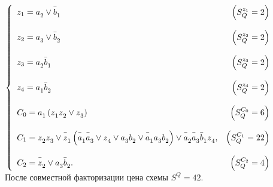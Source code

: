 \documentclass[a4paper, 12pt]{article}
\begin{document}
$\left\lbrace\begin{array}{l r}
	z_1={\mathstrut a}_2\vee\bar{\mathstrut b}_1 & \left(S_Q^{z_1}=2\right)\\\\
	
	z_2={\mathstrut a}_3\vee\bar{\mathstrut b}_2 & \left(S_Q^{z_2}=2\right)\\\\
	
	z_3={\mathstrut a}_2\bar{\mathstrut b}_1 & \left(S_Q^{z_3}=2\right)\\\\
	
	z_4={\mathstrut a}_1\bar{\mathstrut b}_2 & \left(S_Q^{z_4}=2\right)\\\\
	
	C_0={\mathstrut a}_1\left({\mathstrut z}_1{\mathstrut z}_2\vee{\mathstrut z}_3\right) &
	\left(S_Q^{C_0}=6\right)\\\\
	
	C_1={\mathstrut z}_2{\mathstrut z}_3\vee\bar{\mathstrut z}_1\left(
	\bar{\mathstrut a}_1\bar{\mathstrut a}_3\vee{\mathstrut z}_4\vee
	{\mathstrut a}_3{\mathstrut b}_2\vee\bar{\mathstrut a}_1{\mathstrut a}_3
	{\mathstrut b}_2\right)\vee\bar{\mathstrut a}_2\bar{\mathstrut a}_3
	\bar{\mathstrut b}_1{\mathstrut z}_4, & 
	\left(S_Q^{C_1}=22\right)\\\\
	
	C_2=\bar{\mathstrut z}_2\vee{\mathstrut a}_3\bar{\mathstrut b}_2. &
	\left(S_Q^{C_2}=4\right)
\end{array}\right.$\\

После совместной факторизации цена схемы $S^Q=42.$
\end{document}
